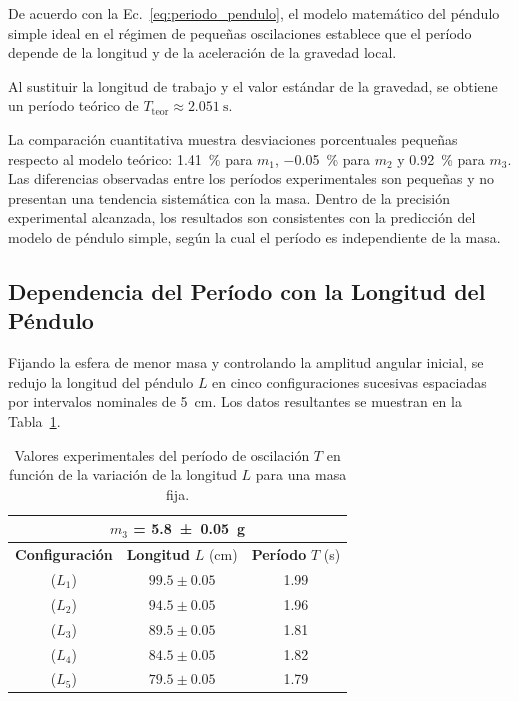 De acuerdo con la Ec.~\eqref{eq:periodo_pendulo}, el modelo matemático del péndulo simple ideal en el régimen de pequeñas oscilaciones establece que el período depende de la longitud y de la aceleración de la gravedad local.

Al sustituir la longitud de trabajo y el valor estándar de la gravedad, se obtiene un período teórico de $T_{\text{teor}} \approx \SI{2.051}{\second}$. 

La comparación cuantitativa muestra desviaciones porcentuales pequeñas respecto al modelo teórico: \SI{1.41}{\percent} para $m_1$, \SI{-0.05}{\percent} para $m_2$ y \SI{0.92}{\percent} para $m_3$. Las diferencias observadas entre los períodos experimentales son pequeñas y no presentan una tendencia sistemática con la masa. Dentro de la precisión experimental alcanzada, los resultados son consistentes con la predicción del modelo de péndulo simple, según la cual el período es independiente de la masa.

\subsection{Dependencia del Período con la Longitud del Péndulo}

Fijando la esfera de menor masa y controlando la amplitud angular inicial, se redujo la longitud del péndulo $L$ en cinco configuraciones sucesivas espaciadas por intervalos nominales de \SI{5}{\centi\meter}. Los datos resultantes se muestran en la Tabla~\ref{tab:tabla_longitudes}.

\begin{table}[htbp]
\centering
\caption{Valores experimentales del período de oscilación $T$ en función de la variación de la longitud $L$ para una masa fija.}
\label{tab:tabla_longitudes}
\begin{tabular}{ccc}
\hline
\multicolumn{3}{c}{$m_3$ = \SI{5.8 \pm 0.05}{\gram}} \\ \hline
\textbf{Configuración} & \textbf{Longitud } $L$ (\si{\centi\meter}) & \textbf{Período } $T$ (\si{\second}) \\
\hline
($L_1$) & $99.5 \pm 0.05$ & 1.99 \\
($L_2$) & $94.5 \pm 0.05$ & 1.96 \\
($L_3$) & $89.5 \pm 0.05$ & 1.81 \\
($L_4$) & $84.5 \pm 0.05$ & 1.82 \\
($L_5$) & $79.5 \pm 0.05$ & 1.79 \\
\hline
\end{tabular}
\end{table}

